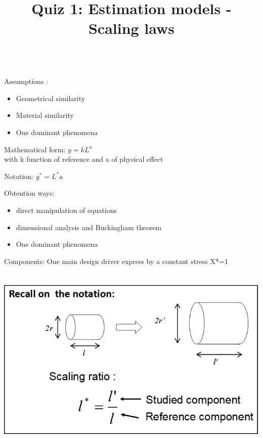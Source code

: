 \documentclass{webquiz}
\title{Quiz 1: Estimation models - Scaling laws}
\begin{document}
 
 
     \begin{discussion}\\ 
     \newline
       Assumptions : 
     \begin{minipage}[t]{.8\textwidth}
    \begin{itemize} 
     \item  Geometrical similarity  
     \item  Material similarity
     \item  One dominant phenomena
     \end{itemize}
      \end{minipage}
  

	Mathematical form:		$y=kL^a $ \\
				with k function of reference and  a of physical effect

Notation:			$y^*=L^*a$

Obtention ways:	
\begin{minipage}[t]{.8\textwidth}
\begin{itemize} 
     \item  direct manipulation of equations 
     \item  dimensional analysis and Buckingham theorem
     \item  One dominant phenomena
     \end{itemize}
\end{minipage}
Components:           One main design driver express by a constant stress X*=1
        \begin{center} 
        \includegraphics[height=90mm]{Picture1.png}
        \end{center}
     \end{discussion} 
 
\end{document}
